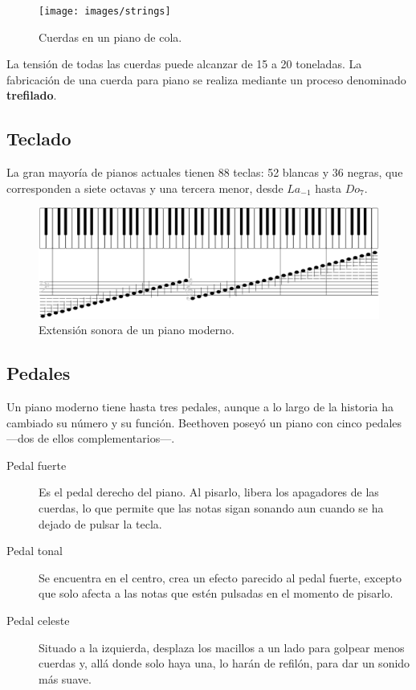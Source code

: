 \documentclass[10pt,a4paper]{article}
\begin{document}
	\begin{figure}[!ht]
		\centering
		\texttt{[image: images/strings]}
		\caption[Cuerdas en un piano]{\label{fig:strings} Cuerdas en un piano de cola. \cite{strings}}
	\end{figure}
	
	La tensión de todas las cuerdas puede alcanzar de 15 a 20 toneladas. La 
	fabricación de una cuerda para piano se realiza mediante un proceso 
	denominado \textbf{trefilado}.
	
	\subsection{Teclado}
	
	La gran mayoría de pianos actuales tienen 88 teclas: 52 blancas y 36 
	negras, que corresponden a siete octavas y una tercera menor, desde 
	$La_{-1}$ hasta $Do_7$.
	
	\begin{figure}[!ht]
		\centering
		\includegraphics[width=\textwidth]{images/range}
		\caption[Extensión sonora]{\label{fig:range} Extensión sonora de un piano moderno. \cite{range}}
	\end{figure}
	
	\subsection{Pedales}
	
	Un piano moderno tiene hasta tres pedales, aunque a lo largo de la historia 
	ha cambiado su número y su función. Beethoven poseyó un piano con cinco 
	pedales ---dos de ellos complementarios---.
	
	\begin{description}
		\item[Pedal fuerte] Es el pedal derecho del piano. Al pisarlo, libera 
		los apagadores de las cuerdas, lo que permite que las notas sigan 
		sonando aun cuando se ha dejado de pulsar la tecla.
		
		\item[Pedal tonal] Se encuentra en el centro, crea un efecto parecido 
		al pedal fuerte, excepto que solo afecta a las notas que estén pulsadas 
		en el momento de pisarlo.
		
		\item[Pedal celeste] Situado a la izquierda, desplaza los macillos a un 
		lado para golpear menos cuerdas y, allá donde solo haya una, lo harán 
		de refilón, para dar un sonido más suave.
	\end{description}
	
\end{document}

